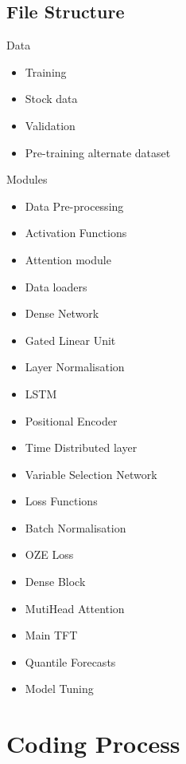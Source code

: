 \documentclass{article}
\begin{document}
\subsection{File Structure}
Data
\begin{itemize}
\item Training
\item Stock data
\item Validation
\item Pre-training alternate dataset
\end{itemize}
Modules
\begin{itemize}
\item Data Pre-processing
\item Activation Functions
\item Attention module
\item Data loaders
\item Dense Network
\item Gated Linear Unit
\item Layer Normalisation
\item LSTM
\item Positional Encoder
\item Time Distributed layer
\item Variable Selection Network
\item Loss Functions
\item Batch Normalisation
\item OZE Loss
\item Dense Block
\item MutiHead Attention
\item Main TFT
\item Quantile Forecasts
\item Model Tuning
\end{itemize}






\section{Coding Process}
\end{document}
